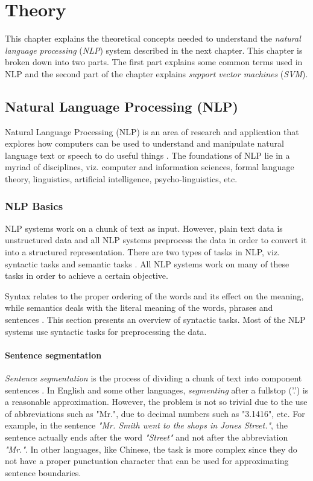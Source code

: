 \chapter{Theory}\label{chapter:theory}

This chapter explains the theoretical concepts needed to understand the \textit{natural language processing} (\textit{NLP}) system described in the next chapter. This chapter is broken down into two parts. The first part explains some common terms used in NLP and the second part of the chapter explains \textit{support vector machines} (\textit{SVM}).

\section{Natural Language Processing (NLP)}

Natural Language Processing (NLP) is an area of research and application that explores how computers can be used to understand and manipulate natural language text or speech to do useful things \cite{chowdhury2003natural}. The foundations of NLP lie in a myriad of disciplines, viz. computer and information sciences, formal language theory, linguistics, artificial intelligence, psycho-linguistics, etc.

\subsection{NLP Basics}\label{sec:NLPPipeline}

NLP systems work on a chunk of text as input. However, plain text data is unstructured data and all NLP systems preprocess the data in order to convert it into a structured representation. There are two types of tasks in NLP, viz. syntactic tasks and semantic tasks \cite{nlpcourse}. All NLP systems work on many of these tasks in order to achieve a certain objective.

Syntax relates to the proper ordering of the words and its effect on the meaning, while semantics deals with the literal meaning of the words, phrases and sentences \cite{wiki:sentSeg}. This section presents an overview of syntactic tasks. Most of the NLP systems use syntactic tasks for preprocessing the data.

\subsubsection{Sentence segmentation}

\textit{Sentence segmentation} is the process of dividing a chunk of text into component sentences \cite{wiki:sentSeg}. In English and some other languages, \emph{segmenting} after a fullstop ('.') is a reasonable approximation. However, the problem is not so trivial due to the use of abbreviations such as "Mr.", due to decimal numbers such as "3.1416", etc. For example, in the sentence \textit{"Mr. Smith went to the shops in Jones Street."}, the sentence actually ends after the word \textit{"Street"} and not after the abbreviation \textit{"Mr."}. In other languages, like Chinese, the task is more complex since they do not have a proper punctuation character that can be used for approximating sentence boundaries.

